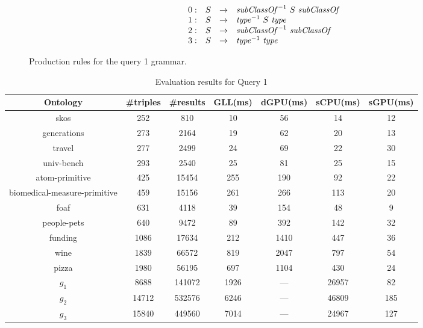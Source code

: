 \begin{figure}[h]
   \[
\begin{array}{rccl}
   0: & S & \rightarrow & \text{\textit{subClassOf}}^{-1} \ S \ \text{\textit{subClassOf}} \\ 
   1: & S & \rightarrow & \text{\textit{type}}^{-1} \ S \ \text{\textit{type}} \\ 
   2: & S & \rightarrow & \text{\textit{subClassOf}}^{-1} \ \text{\textit{subClassOf}} \\ 
   3: & S & \rightarrow & \text{\textit{type}}^{-1} \ \text{\textit{type}} \\ 
\end{array}
\]
\caption{Production rules for the query 1 grammar.}
\label{ProductionRulesQuery1}
\end{figure}

\begin{table*}[ht]
\centering
\caption{Evaluation results for Query 1}
\label{tbl1}

\begin{tabular}{ | c | c | c | c | c | c | c |}
\hline
Ontology & \#triples & \#results & GLL(ms) & dGPU(ms) & sCPU(ms) & sGPU(ms) \\
\hline 
\hline
skos        & 252 & 810 & 10 & 56 & 14 & 12\\
generations & 273 & 2164 & 19 & 62 & 20 & 13\\
travel      & 277 & 2499 & 24 & 69 & 22 & 30\\
univ-bench  & 293 & 2540 & 25 & 81 & 25 & 15\\
atom-primitive & 425 & 15454 & 255 & 190 & 92 & 22\\
biomedical-measure-primitive & 459 & 15156 & 261 & 266 & 113 & 20\\
foaf        & 631 & 4118 & 39 & 154 & 48 & 9\\
people-pets & 640 & 9472 & 89 & 392 & 142 & 32\\
funding     & 1086 & 17634 & 212 & 1410 & 447 & 36\\
wine        & 1839 & 66572 & 819 & 2047 & 797 & 54\\
pizza       & 1980 & 56195 & 697 & 1104 & 430 & 24\\
$g_{1}$     & 8688 & 141072 & 1926 & --- & 26957 & 82\\
$g_{2}$     & 14712 & 532576 & 6246 & --- & 46809 & 185\\
$g_{3}$     & 15840 & 449560 & 7014 & --- & 24967 & 127\\
\hline
\end{tabular}

\end{table*}

